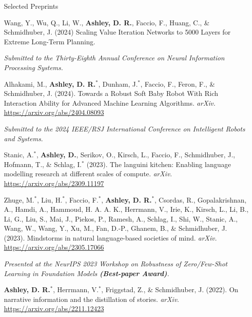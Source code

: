\documentclass{cv}
\begin{document}
\begin{rSection}{Selected Preprints}

\begin{rPublications}
    \item
        Wang, Y., Wu, Q., Li, W., \textbf{Ashley, D. R.}, Faccio, F., Huang, C., \& Schmidhuber, J.
        (2024)
        Scaling Value Iteration Networks to 5000 Layers for Extreme Long-Term Planning.

        \vspace{-0.25em} \textit{Submitted to the Thirty-Eighth Annual Conference on Neural Information Processing Systems.}
    \item
        Alhakami, M., \textbf{Ashley, D. R.}$^*$, Dunham, J.$^*$, Faccio, F., Feron, F., \& Schmidhuber, J.
        (2024).
        Towards a Robust Soft Baby Robot With Rich Interaction Ability for Advanced Machine Learning Algorithms.
        \textit{arXiv.}
        \url{https://arxiv.org/abs/2404.08093}

        \vspace{-0.25em} \textit{Submitted to the 2024 {IEEE/RSJ} International Conference on Intelligent Robots and Systems.}
    \item
        Stanic, A.$^*$, \textbf{Ashley, D.}, Serikov, O., Kirsch, L., Faccio, F., Schmidhuber, J., Hofmann, T., \& Schlag, I.$^*$
        (2023).
        The languini kitchen: Enabling language modelling research at different scales of compute.
        \textit{arXiv.}
        \url{https://arxiv.org/abs/2309.11197}
    \item
        Zhuge, M.$^*$, Liu, H.$^*$, Faccio, F.$^*$, \textbf{Ashley, D. R.}$^*$, Csordas, R., Gopalakrishnan, A., Hamdi, A., Hammoud, H. A. A. K., Herrmann, V., Irie, K., Kirsch, L., Li, B., Li, G., Liu, S., Mai, J., Piekos, P., Ramesh, A., Schlag, I., Shi, W., Stanic, A., Wang, W., Wang, Y., Xu, M., Fan, D.-P., Ghanem, B., \& Schmidhuber, J.
        (2023).
        Mindstorms in natural language-based societies of mind.
        \textit{arXiv.}
        \url{https://arxiv.org/abs/2305.17066}

        \vspace{-0.25em} \textit{Presented at the NeurIPS 2023 Workshop on Robustness of Zero/Few-Shot Learning in Foundation Models \textbf{(Best-paper Award)}.}
    \item
        \textbf{Ashley, D. R.}$^*$, Herrmann, V.$^*$, Friggstad, Z., \& Schmidhuber, J.
        (2022).
        On narrative information and the distillation of stories.
        \textit{arXiv.}
        \url{https://arxiv.org/abs/2211.12423}


\end{rPublications}
\end{rSection}
\end{document}
